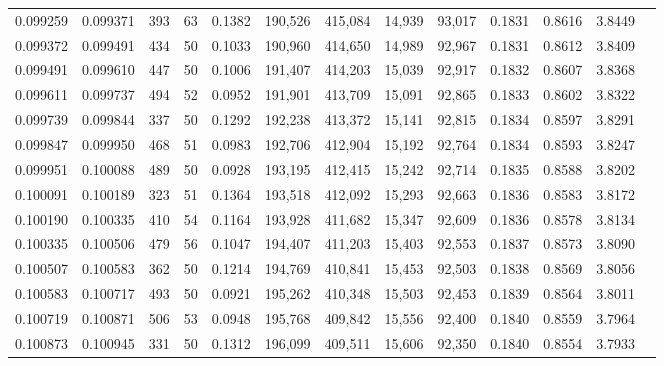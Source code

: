 \begin{tabular}{rrrrrrrrrrrrr}
0.099259 & 0.099371 &   393 &  63 &                                     0.1382 & 190,526 & 415,084 &  14,939 &  93,017 & 0.1831 & 0.8616 & 3.8449 \\
0.099372 & 0.099491 &   434 &  50 &                                     0.1033 & 190,960 & 414,650 &  14,989 &  92,967 & 0.1831 & 0.8612 & 3.8409 \\
0.099491 & 0.099610 &   447 &  50 &                                     0.1006 & 191,407 & 414,203 &  15,039 &  92,917 & 0.1832 & 0.8607 & 3.8368 \\
0.099611 & 0.099737 &   494 &  52 &                                     0.0952 & 191,901 & 413,709 &  15,091 &  92,865 & 0.1833 & 0.8602 & 3.8322 \\
0.099739 & 0.099844 &   337 &  50 &                                     0.1292 & 192,238 & 413,372 &  15,141 &  92,815 & 0.1834 & 0.8597 & 3.8291 \\
0.099847 & 0.099950 &   468 &  51 &                                     0.0983 & 192,706 & 412,904 &  15,192 &  92,764 & 0.1834 & 0.8593 & 3.8247 \\
0.099951 & 0.100088 &   489 &  50 &                                     0.0928 & 193,195 & 412,415 &  15,242 &  92,714 & 0.1835 & 0.8588 & 3.8202 \\
0.100091 & 0.100189 &   323 &  51 &                                     0.1364 & 193,518 & 412,092 &  15,293 &  92,663 & 0.1836 & 0.8583 & 3.8172 \\
0.100190 & 0.100335 &   410 &  54 &                                     0.1164 & 193,928 & 411,682 &  15,347 &  92,609 & 0.1836 & 0.8578 & 3.8134 \\
0.100335 & 0.100506 &   479 &  56 &                                     0.1047 & 194,407 & 411,203 &  15,403 &  92,553 & 0.1837 & 0.8573 & 3.8090 \\
0.100507 & 0.100583 &   362 &  50 &                                     0.1214 & 194,769 & 410,841 &  15,453 &  92,503 & 0.1838 & 0.8569 & 3.8056 \\
0.100583 & 0.100717 &   493 &  50 &                                     0.0921 & 195,262 & 410,348 &  15,503 &  92,453 & 0.1839 & 0.8564 & 3.8011 \\
0.100719 & 0.100871 &   506 &  53 &                                     0.0948 & 195,768 & 409,842 &  15,556 &  92,400 & 0.1840 & 0.8559 & 3.7964 \\
0.100873 & 0.100945 &   331 &  50 &                                     0.1312 & 196,099 & 409,511 &  15,606 &  92,350 & 0.1840 & 0.8554 & 3.7933 \\

\end{tabular}
